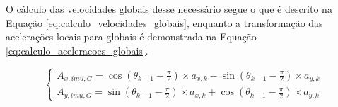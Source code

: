 \documentclass[acronym, symbols, table]{fei}
\begin{document}
			O cálculo das velocidades globais desse necessário segue o que é descrito na Equação \ref{eq:calculo_velocidades_globais}, enquanto a transformação das acelerações locais para globais é demonstrada na Equação \ref{eq:calculo_aceleracoes_globais}.
			
			\begin{equation}\label{eq:calculo_aceleracoes_globais}
				\begin{cases}
					A_{x,imu,G} = \cos(\theta_{k-1} - \frac{\pi}{2}) \times a_{x,k} - \sin(\theta_{k-1} - \frac{\pi}{2}) \times a_{y,k} \\
					A_{y,imu,G} = \sin(\theta_{k-1} - \frac{\pi}{2}) \times a_{x,k} + \cos(\theta_{k-1} - \frac{\pi}{2}) \times a_{y,k}
				\end{cases}
			\end{equation}
		
\end{document}
